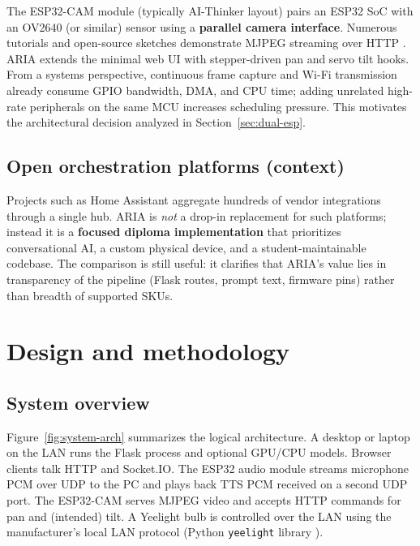 \documentclass[12pt,a4paper]{report}
\begin{document}
The ESP32-CAM module (typically AI-Thinker layout) pairs an ESP32 SoC with an OV2640 (or similar) sensor using a \textbf{parallel camera interface}. Numerous tutorials and open-source sketches demonstrate MJPEG streaming over HTTP \cite{esp-idf}. ARIA extends the minimal web UI with stepper-driven pan and servo tilt hooks. From a systems perspective, continuous frame capture and Wi-Fi transmission already consume GPIO bandwidth, DMA, and CPU time; adding unrelated high-rate peripherals on the same MCU increases scheduling pressure. This motivates the architectural decision analyzed in Section~\ref{sec:dual-esp}.

\section{Open orchestration platforms (context)}

Projects such as Home Assistant aggregate hundreds of vendor integrations through a single hub. ARIA is \textit{not} a drop-in replacement for such platforms; instead it is a \textbf{focused diploma implementation} that prioritizes conversational AI, a custom physical device, and a student-maintainable codebase. The comparison is still useful: it clarifies that ARIA's value lies in transparency of the pipeline (Flask routes, prompt text, firmware pins) rather than breadth of supported SKUs.

\chapter{Design and methodology}

\section{System overview}

Figure~\ref{fig:system-arch} summarizes the logical architecture. A desktop or laptop on the LAN runs the Flask process and optional GPU/CPU models. Browser clients talk HTTP and Socket.IO. The ESP32 audio module streams microphone PCM over UDP to the PC and plays back TTS PCM received on a second UDP port. The ESP32-CAM serves MJPEG video and accepts HTTP commands for pan and (intended) tilt. A Yeelight bulb is controlled over the LAN using the manufacturer's local LAN protocol (Python \texttt{yeelight} library \cite{yeelight}).
\end{document}
